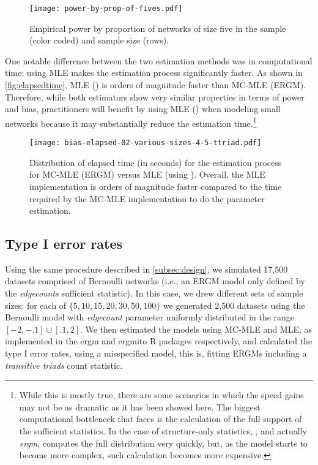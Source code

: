 \documentclass[review]{elsarticle}
\begin{document}
\begin{figure}[ht]
	\centering
	\caption{\label{fig:power-prop5s}Empirical power by proportion of networks of size five in the sample (color coded) and sample size (rows).}
	\texttt{[image: power-by-prop-of-fives.pdf]}
\end{figure}

One notable difference between the two estimation methods was in computational time: using MLE makes the estimation process significantly faster. As shown in \autoref{fig:elapsedtime}, MLE (\ergmito{}) is orders of magnitude faster than MC-MLE (ERGM). Therefore, while both estimators show very similar properties in terms of power and bias, practitioners will benefit by using MLE (\ergmito{}) when modeling small networks because it may substantially reduce the estimation time.\footnote{While this is mostly true, there are some scenarios in which the speed gains may not be as dramatic as it has been showed here. The biggest computational bottleneck that \ergmito{} faces is the calculation of the full support of the sufficient statistics. In the case of structure-only statistics, \ergmito{}, and actually \textit{ergm}, computes the full distribution very quickly, but, as the model starts to become more complex, such calculation becomes more expensive.}

\begin{figure}
	\centering
	\caption{\label{fig:elapsedtime}Distribution of elapsed time (in seconds) for the estimation process for MC-MLE (ERGM) versus MLE (using \ergmito{}). Overall, the MLE implementation is orders of magnitude faster compared to the time required by the MC-MLE implementation to do the parameter estimation.}
	\texttt{[image: bias-elapsed-02-various-sizes-4-5-ttriad.pdf]}
\end{figure}





\subsection{Type I error rates}

Using the same procedure described in \autoref{subsec:design}, we simulated 17,500 datasets comprised of Bernoulli networks (i.e., an ERGM model only defined by the \textit{edgecounts} sufficient statistic). In this case, we drew  different sets of sample sizes: for each of $\{5, 10, 15, 20, 30, 50, 100\}$ we generated 2,500 datasets using the Bernoulli model with \textit{edgecount} parameter uniformly distributed in the range $[-2, -.1]\cup [.1, 2]$. We then estimated the models using MC-MLE and MLE, as implemented in the ergm and ergmito R packages respectively, and calculated the type I error rates, using a misspecified model, this is, fitting ERGMs including a \textit{transitive triads} count statistic. 
\end{document}
